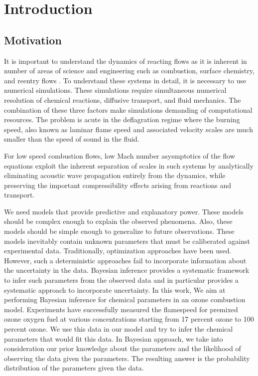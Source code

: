 
\chapter{Introduction}

\section{Motivation}
It is important to understand the dynamics of reacting flows as it is inherent in number of areas of science and engineering such as combustion, surface chemistry, and reentry flows . To understand these systems in detail, it is necessary to use numerical simulations. These simulations require simultaneous numerical resolution of chemical reactions, diffusive transport, and fluid mechanics. The combination of these three factors make simulations demanding of computational resources. The problem is acute in the deflagration regime where the burning speed, also known as laminar flame speed and associated velocity scales are much smaller than the speed of sound in the fluid.

\bigskip
\noindent For low speed combustion flows, low Mach number asysmptotics of the flow equations exploit the inherent separation of scales in such systems by analytically eliminating acoustic wave propagation entirely from the dynamics, while preserving the important compressibility effects arising from reactions and transport.

\bigskip
\noindent  We need models that provide predictive and explanatory power. These models should be complex enough to explain the observed phenomena. Also, these models should be simple enough to generalize to future observations. These models inevitably contain unknown parameters that must be caliberated against experimental data. Traditionally, optimization approaches have been used. However, such a deterministic approaches fail to incorporate information about the uncertainty in the data. Bayesian inference provides a systematic framework to infer such parameters from the observed data and in particular provides a systematic approach to incorporate uncertainty. 
In this work, We aim at performing Bayesian inference for chemical parameters in an ozone combustion model. Experiments\cite{Streng} have successfully measured the flamespeed for premixed ozone oxygen   fuel at various concentrations starting from  17 percent ozone to 100 percent ozone. We use this data in our model and try to infer the chemical parameters that would fit this data. In Bayesian approach, we take into consideration our prior knowledge about the parameters and the likelihood of observing the data given the parameters. The resulting answer is the probability distribution of the parameters given the data.  


